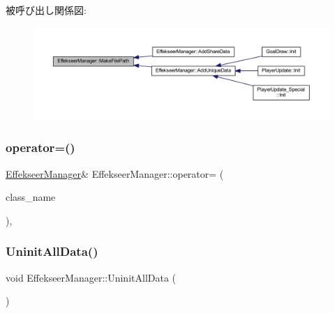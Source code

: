被呼び出し関係図\+:
\nopagebreak
\begin{figure}[H]
\begin{center}
\leavevmode
\includegraphics[width=350pt]{class_effekseer_manager_ad6c9359de20c955af42a72c145571168_icgraph}
\end{center}
\end{figure}
\mbox{\label{class_effekseer_manager_ade688aba495d8a9d74f2d8de98e9bb75}} 
\subsubsection{\texorpdfstring{operator=()}{operator=()}}
{\footnotesize\ttfamily \mbox{\hyperlink{class_effekseer_manager}{Effekseer\+Manager}}\& Effekseer\+Manager\+::operator= (\begin{DoxyParamCaption}\item[{const \mbox{\hyperlink{class_effekseer_manager}{Effekseer\+Manager}} \&}]{class\+\_\+name }\end{DoxyParamCaption})\hspace{0.3cm}{\ttfamily [private]}, {\ttfamily [delete]}}

\mbox{\label{class_effekseer_manager_aa9f5c911182097238d979cc628f2dc13}} 
\subsubsection{\texorpdfstring{Uninit\+All\+Data()}{UninitAllData()}}
{\footnotesize\ttfamily void Effekseer\+Manager\+::\+Uninit\+All\+Data (\begin{DoxyParamCaption}{ }\end{DoxyParamCaption})\hspace{0.3cm}{\ttfamily [static]}}



